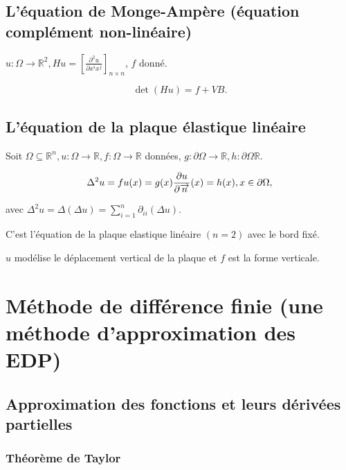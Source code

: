 \documentclass[french]{article}
\theoremstyle{definition}
\begin{document}
\subsection{L'équation de Monge-Ampère (équation complément non-linéaire)}

\(u : \Omega \longrightarrow \mathbb{R}^2, Hu = \left[\displaystyle\frac{\partial ^2 u }{\partial x ^{i}x^{j}} \right] _{n \times n}\), \(f\) donné.

\begin{equation*}
  \operatorname{det}(Hu ) = f + VB.
\end{equation*}

\subsection{L'équation de la plaque élastique linéaire}

Soit \(\Omega \subseteq \mathbb{R}^n, u : \Omega \longrightarrow \mathbb{R}, f : \Omega \longrightarrow \mathbb{R}\) données, \(g : \partial \Omega \longrightarrow \mathbb{R}, h : \partial \Omega \mathbb{R}\).

\begin{equation}
  \Delta ^2 u = f \\
  u(x) = g(x) \\
  \displaystyle\frac{\partial u }{\partial \overrightarrow{n}}(x) = h(x), x \in \partial \Omega,
\end{equation}

avec \(\Delta ^2 u = \Delta(\Delta u) = \displaystyle\sum_{i=1}^{n}\partial _{ii}(\Delta u)\).

C'est l'équation de la plaque elastique linéaire \((n=2)\) avec le bord fixé.

\(u\) modélise le déplacement vertical de la plaque et \(f\) est la forme verticale.

\section{Méthode de différence finie (une méthode d'approximation des EDP)}

\subsection{Approximation des fonctions et leurs dérivées partielles}

\subsubsection{Théorème de Taylor}
\end{document}
